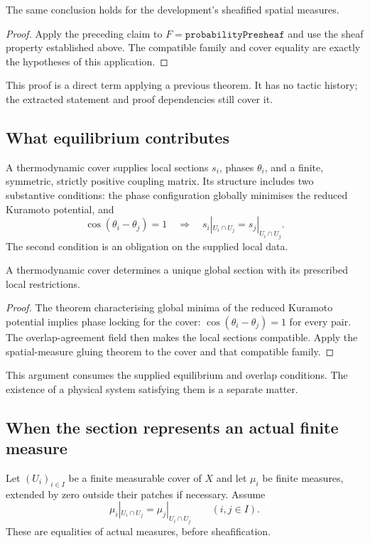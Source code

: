 \begin{claim}
The same conclusion holds for the development's sheafified spatial measures.
\end{claim}
\begin{proof}
Apply the preceding claim to $F=\texttt{probabilityPresheaf}$ and use the
sheaf property established above. The compatible family and cover equality
are exactly the hypotheses of this application.
\end{proof}
\scope This proof is a direct term applying a previous theorem. It has no
tactic history; the extracted statement and proof dependencies still cover it.

\subsection{What equilibrium contributes}
A thermodynamic cover supplies local sections $s_i$, phases $\theta_i$, and a
finite, symmetric, strictly positive coupling matrix. Its structure includes
two substantive conditions: the phase configuration globally minimises the
reduced Kuramoto potential, and
\[
 \cos(\theta_i-\theta_j)=1
 \quad\Longrightarrow\quad
 s_i|_{U_i\cap U_j}=s_j|_{U_i\cap U_j}.
\]
The second condition is an obligation on the supplied local data.

\begin{claim}
A thermodynamic cover determines a unique global section with its prescribed
local restrictions.
\end{claim}
\begin{proof}
The theorem characterising global minima of the reduced Kuramoto potential
implies phase locking for the cover: $\cos(\theta_i-\theta_j)=1$ for every pair.
The overlap-agreement field then makes the local sections compatible. Apply
the spatial-measure gluing theorem to the cover and that compatible family.
\end{proof}
\scope This argument consumes the supplied equilibrium and overlap conditions.
The existence of a physical system satisfying them is a separate matter.

\subsection{When the section represents an actual finite measure}
Let $(U_i)_{i\in I}$ be a finite measurable cover of $X$ and let $\mu_i$ be
finite measures, extended by zero outside their patches if necessary. Assume
\[
 \mu_i|_{U_i\cap U_j}=\mu_j|_{U_i\cap U_j}\qquad(i,j\in I).
\]
These are equalities of actual measures, before sheafification.


